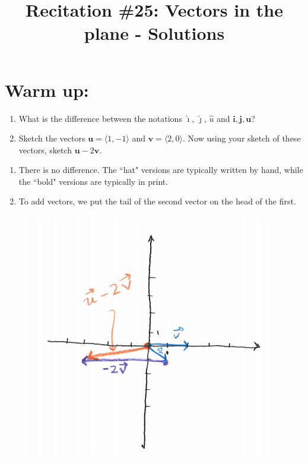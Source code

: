 \documentclass[noinstructornotes]{ximera}
\title{Recitation \#25: Vectors in the plane - Solutions}
\begin{document}
\begin{abstract}		\end{abstract}
\maketitle




\section{Warm up:}
\begin{enumerate}
\item What is the difference between the notations $\hat{\imath}$, $\hat{\jmath}$, $\hat{u}$ and $\mathbf{i}, \mathbf{j}, \mathbf{u}$?
\item Sketch the vectors $\mathbf{u}=\langle 1, -1 \rangle$ and $\mathbf{v}=\langle 2, 0 \rangle$. Now using your sketch of these vectors, sketch $\mathbf{u}-2\mathbf{v}$.
\end{enumerate}
	\begin{freeResponse}
	\begin{enumerate}
	\item There is no difference. The ``hat" versions are typically written by hand, while the ``bold" versions are typically in print. 
	\item To add vectors, we put the tail of the second vector on the head of the first. 


\includegraphics[scale=0.5]{Figure12-1-1}



	\end{enumerate}
	\end{freeResponse}
	
\end{document}
